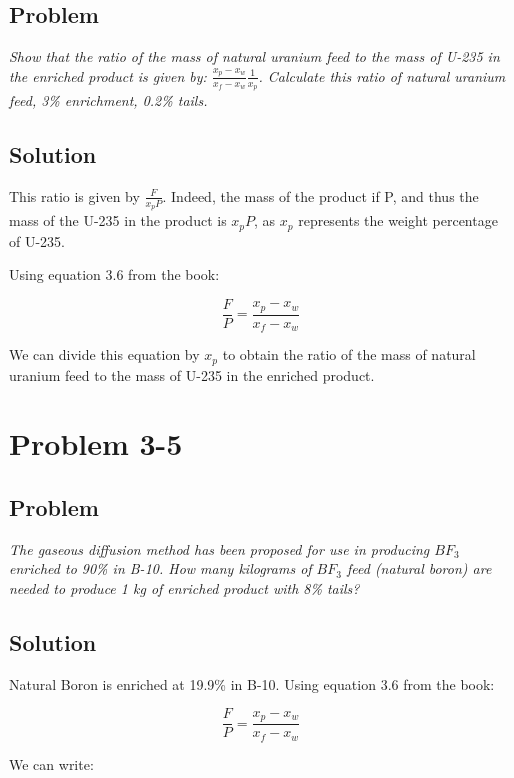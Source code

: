 \subsection{Problem}
\textit{Show that the ratio of the mass of natural uranium feed to the mass of U-235 in the enriched product is given by: $\frac{x_p-x_w}{x_f-x_w}\frac{1}{x_p}$. Calculate this ratio of natural uranium feed, 3\% enrichment, 0.2\% tails.}

\subsection{Solution}


This ratio is given by $\frac{F}{x_pP}$. Indeed, the mass of the product if P, and thus the mass of the U-235 in the product is $x_pP$, as $x_p$ represents the weight percentage of U-235.

Using equation 3.6 from the book:

\begin{equation}
\frac{F}{P} = \frac{x_p - x_w}{x_f - x_w}
\end{equation}

We can divide this equation by $x_p$ to obtain the ratio of the mass of natural uranium feed to the mass of U-235 in the enriched product.


\section{Problem 3-5}
\label{prob35}

\subsection{Problem}
\textit{The gaseous diffusion method has been proposed for use in producing $BF_3$ enriched to 90\% in B-10. How many kilograms of $BF_3$ feed (natural boron) are needed to produce 1 kg of enriched product with 8\% tails?}

\subsection{Solution}

Natural Boron is enriched at 19.9\% in B-10. Using equation 3.6 from the book:

\begin{equation}
\frac{F}{P} = \frac{x_p - x_w}{x_f - x_w}
\end{equation}

We can write:

